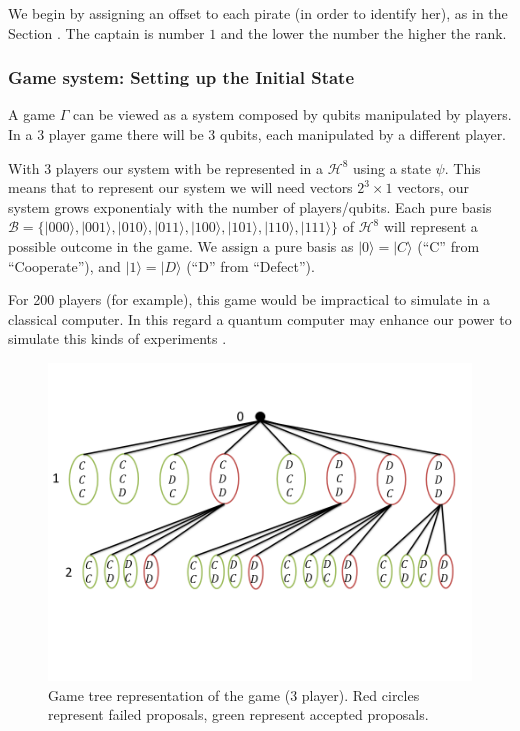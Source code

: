 We begin by assigning an offset to each pirate (in order to identify her), as in the Section \label{subsec:description}. The captain is number $1$ and the lower the number the higher the rank. 



\subsubsection{Game system: Setting up the Initial State}
\label{subsec:pirates_initialstate}

A game $\Gamma$ can be viewed as a system composed by qubits manipulated by players. In a $3$ player game there will be $3$ qubits, each manipulated by a different player. 

With $3$ players our system with be represented in a $\mathcal{H}^{8}$ using a state $\psi$. This means that to represent our system we will need vectors $2^{3}\times 1$ vectors, our system grows exponentialy with the number of players/qubits. Each pure basis $\mathcal{B}= \{ \vert 000\rangle , \vert 001\rangle , \vert 010\rangle , \vert 011\rangle , \vert 100\rangle , \vert 101\rangle , \vert 110\rangle , \vert 111\rangle \}$ of $\mathcal{H}^{8}$ will represent a possible outcome in the game. We assign a pure basis as $\vert 0\rangle = \vert C\rangle$ (``C'' from ``Cooperate''), and $\vert 1\rangle = \vert D\rangle$ (``D'' from ``Defect'').

For 200 players (for example), this game would be impractical to simulate in a classical computer. In this regard a quantum computer may enhance our power to simulate this kinds of experiments \cite{Rieffel2011}.

\begin{figure}[h]
\centering 
\includegraphics[scale=0.55]{Figures/architecture/GameTree/Slide1.png}
\caption{Game tree representation of the game ($3$ player). Red circles represent failed proposals, green represent accepted proposals. }
\label{fig:pg_architecturegametree}
\end{figure}

